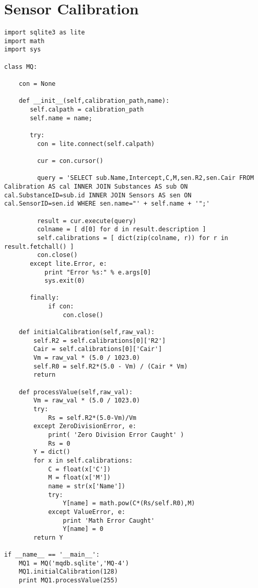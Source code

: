 \section{Sensor Calibration}
\begin{verbatim}
import sqlite3 as lite
import math
import sys

class MQ:

    con = None

    def __init__(self,calibration_path,name):
       self.calpath = calibration_path
       self.name = name;

       try:
         con = lite.connect(self.calpath)

         cur = con.cursor()

         query = 'SELECT sub.Name,Intercept,C,M,sen.R2,sen.Cair FROM Calibration AS cal INNER JOIN Substances AS sub ON cal.SubstanceID=sub.id INNER JOIN Sensors AS sen ON cal.SensorID=sen.id WHERE sen.name="' + self.name + '";'

         result = cur.execute(query)
         colname = [ d[0] for d in result.description ]
         self.calibrations = [ dict(zip(colname, r)) for r in result.fetchall() ]
         con.close()
       except lite.Error, e:
           print "Error %s:" % e.args[0]
           sys.exit(0)

       finally:
            if con:
                con.close()

    def initialCalibration(self,raw_val):
        self.R2 = self.calibrations[0]['R2'] 
        Cair = self.calibrations[0]['Cair']
        Vm = raw_val * (5.0 / 1023.0)
        self.R0 = self.R2*(5.0 - Vm) / (Cair * Vm)
        return

    def processValue(self,raw_val):
        Vm = raw_val * (5.0 / 1023.0)
        try:
            Rs = self.R2*(5.0-Vm)/Vm        
        except ZeroDivisionError, e:
            print( 'Zero Division Error Caught' )
            Rs = 0
        Y = dict()
        for x in self.calibrations: 
            C = float(x['C'])
            M = float(x['M'])
            name = str(x['Name'])
            try:
                Y[name] = math.pow(C*(Rs/self.R0),M)
            except ValueError, e:
                print 'Math Error Caught'
                Y[name] = 0
        return Y

if __name__ == '__main__':
    MQ1 = MQ('mqdb.sqlite','MQ-4')
    MQ1.initialCalibration(128)
    print MQ1.processValue(255)
\end{verbatim}


